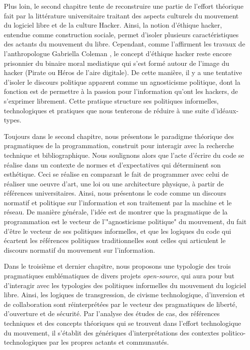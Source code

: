 Plus loin, le second chapitre tente de reconstruire une partie de l'effort théorique fait par la littérature universitaire traitant des aspects culturels du mouvement du logiciel libre et de la culture Hacker. Ainsi, la notion d'éthique hacker, entendue comme construction sociale, permet d'isoler plusieurs caractéristiques des actants du mouvement du libre. Cependant, comme l'affirment les travaux de l'anthropologue Gabriella Coleman \citep*{Coleman+Golub2008}, le concept d'éthique hacker reste encore prisonnier du binaire moral mediatique qui s'est formé autour de l'image du hacker (Pirate ou Héros de l'aire digitale). De cette manière, il y a une tentative d'isoler le discours politique apparent comme un agnosticisme politique, dont la fonction est de permettre à la passion pour l'information qu'ont les hackers, de s'exprimer librement. Cette pratique structure ses politiques informelles, technologiques et pratiques que nous tenterons de réduire à une suite d'idéaux-types.

Toujours dans le second chapitre, nous présentons le paradigme théorique des pragmatiques de la programmation, construit pour interagir avec la recherche technique et bibliographique. Nous soulignons alors que l'acte d'écrire du code se réalise dans un contexte de normes et d'expectatives qui déterminent son esthétique. Ceci se réalise en comparant le fait de programmer avec celui de réaliser une oeuvre d'art, une loi ou une architecture physique, à partir de références universitaires. Ainsi, nous présentons le code comme un discours normatif et politique sur l'information et son traitement par la machine et le réseau. De manière générale, l'idée est de montrer que la pragmatique de la programmation est le vecteur de l'"agnosticisme politique" du mouvement, du fait d'être le vecteur de ses politiques informelles, et que les logiques du code qui écartent les références politiques traditionnelles sont celles qui articulent le discours normatif du mouvement sur l'information.

Dans le troisième et dernier chapitre, nous proposons une typologie des trois pragmatiques emblématiques de divers projets \emph{open-source}, qui aura pour but d'interagir avec les typologies des politiques informelles du mouvement du logiciel libre. Ainsi, les logiques de transgression, de civisme technologique, d'inversion et de collaboration sont réinterprétées par le vecteur des pragmatiques de liberté, d'ouverture et de sécurité. Par l'analyse des études de cas, des références techniques et des concepts théoriques qui se trouvent dans l'effort technologique du mouvement, il s'établit des génériques d'interprétations des contextes politico-technologiques par les propres actants et communautés.
